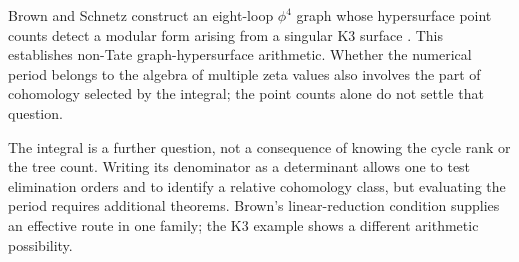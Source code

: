 \documentclass[11pt]{article}
\theoremstyle{definition}
\theoremstyle{remark}
\begin{document}
Brown and Schnetz construct an eight-loop $\phi^4$ graph whose hypersurface point counts detect a modular form arising from a singular K3 surface \cite{BrownSchnetzKThree}. This establishes non-Tate graph-hypersurface arithmetic. Whether the numerical period belongs to the algebra of multiple zeta values also involves the part of cohomology selected by the integral; the point counts alone do not settle that question.

The integral is a further question, not a consequence of knowing the cycle rank or the tree count. Writing its denominator as a determinant allows one to test elimination orders and to identify a relative cohomology class, but evaluating the period requires additional theorems. Brown's linear-reduction condition supplies an effective route in one family; the K3 example shows a different arithmetic possibility.
\end{document}
